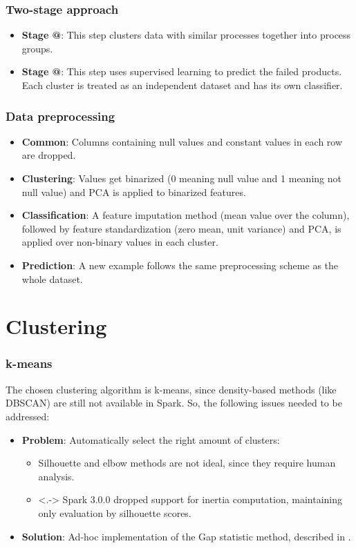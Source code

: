 \documentclass{beamer}
\makeatletter
\newcommand*{\rom}[1]{\expandafter\@slowromancap\romannumeral #1@}
\makeatother
\begin{document}
\begin{frame}
  \frametitle{Two-stage approach}
  \begin{itemize}[<+->]
    \item \textbf{Stage \rom{1}}: This step clusters data with similar processes together into process groups.
    \item \textbf{Stage \rom{2}}: This step uses supervised learning to predict the failed products. Each cluster is treated as an independent dataset and has its own classifier.
  \end{itemize}
\end{frame}

\begin{frame}
  \frametitle{Data preprocessing}
  \begin{itemize}[<+->]
    \item \textbf{Common}: Columns containing null values and constant values in each row are dropped.
    \item \textbf{Clustering}: Values get binarized (0 meaning null value and 1 meaning not null value) and PCA is applied to binarized features.
    \item \textbf{Classification}: A feature imputation method (mean value over the column), followed by feature standardization (zero mean, unit variance) and PCA, is applied over non-binary values in each cluster.
    \item \textbf{Prediction}: A new example follows the same preprocessing scheme as the whole dataset.
  \end{itemize}
\end{frame}

\section{Clustering}
\begin{frame}
  \frametitle{k-means}
    The chosen clustering algorithm is k-means, since density-based methods (like DBSCAN) are still not available in Spark. So, the following issues needed to be addressed:
    \begin{itemize}[<+->]
      \item \textbf{Problem}: Automatically select the right amount of clusters:
      \begin{itemize}
        \item Silhouette and elbow methods are not ideal, since they require human analysis.
        \item<.-> Spark 3.0.0 dropped support for inertia computation, maintaining only evaluation by silhouette scores.
      \end{itemize} 
      \item \textbf{Solution}: Ad-hoc implementation of the Gap statistic method, described in \cite{gap}.
    \end{itemize}
\end{frame}
\end{document}
